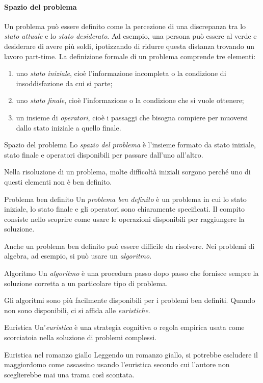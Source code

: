 \documentclass[a4paper]{article}
\begin{document}
\paragraph{Spazio del problema}
Un problema può essere definito come la percezione di una discrepanza tra lo \emph{stato attuale} e lo \emph{stato desiderato}. Ad esempio, una persona può essere al verde e desiderare di avere più soldi, ipotizzando di ridurre questa distanza trovando un lavoro part-time.
La definizione formale di un problema comprende tre elementi:
\begin{enumerate}
    \item uno \emph{stato iniziale}, cioè l'informazione incompleta o la condizione di insoddisfazione da cui si parte;
    \item uno \emph{stato finale}, cioè l'informazione o la condizione che si vuole ottenere;
    \item un insieme di \emph{operatori}, cioè i passaggi che bisogna compiere per muoversi dallo stato iniziale a quello finale.
\end{enumerate}
\begin{snippetdefinition}{Spazio del problema}
    Lo \emph{spazio del problema} è l'insieme formato da stato iniziale, stato finale e operatori disponibili per passare dall'uno all'altro.
\end{snippetdefinition}
Nella risoluzione di un problema, molte difficoltà iniziali sorgono perché uno di questi elementi non è ben definito.
\begin{snippetdefinition}{Problema ben definito}
    Un \emph{problema ben definito} è un problema in cui lo stato iniziale, lo stato finale e gli operatori sono chiaramente specificati. Il compito consiste nello scoprire come usare le operazioni disponibili per raggiungere la soluzione.
\end{snippetdefinition}
Anche un problema ben definito può essere difficile da risolvere. Nei problemi di algebra, ad esempio, si può usare un \emph{algoritmo}.
\begin{snippetdefinition}{Algoritmo}
    Un \emph{algoritmo} è una procedura passo dopo passo che fornisce sempre la soluzione corretta a un particolare tipo di problema.
\end{snippetdefinition}
Gli algoritmi sono più facilmente disponibili per i problemi ben definiti. Quando non sono disponibili, ci si affida alle \emph{euristiche}.
\begin{snippetdefinition}{Euristica}
    Un'\emph{euristica} è una strategia cognitiva o regola empirica usata come scorciatoia nella soluzione di problemi complessi.
\end{snippetdefinition}
\begin{snippetexample}{Euristica nel romanzo giallo}
    Leggendo un romanzo giallo, si potrebbe escludere il maggiordomo come assassino usando l'euristica secondo cui l'autore non sceglierebbe mai una trama così scontata.
\end{snippetexample}
\end{document}
